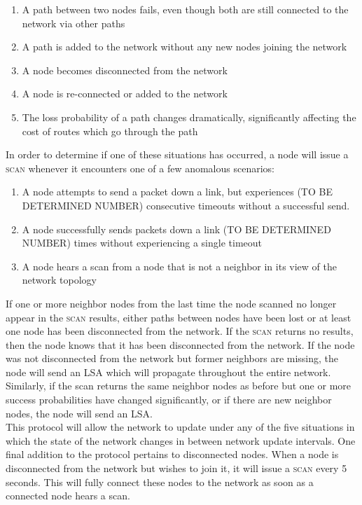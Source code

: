 \documentclass[letterpaper]{article}
\begin{document}
\begin{enumerate}
  \item A path between two nodes fails, even though both are still connected to the network via other
  paths
  \item A path is added to the network without any new nodes joining the network
  \item A node becomes disconnected from the network
  \item A node is re-connected or added to the network
  \item The loss probability of a path changes dramatically, significantly affecting the cost of
  routes which go through the path
\end{enumerate}

\noindent In order to determine if one of these situations has occurred, a node will issue a 
\textsc{scan} whenever it encounters one of a few anomalous scenarios:

\begin{enumerate}
  \item A node attempts to send a packet down a link, but experiences (TO BE DETERMINED NUMBER) 
  consecutive timeouts without a successful send.
  \item A node successfully sends packets down a link (TO BE DETERMINED NUMBER) times without
  experiencing a single timeout
  \item A node hears a scan from a node that is not a neighbor in its view of the network topology
\end{enumerate}

\noindent If one or more neighbor nodes from the last time the node scanned no longer appear in 
the \textsc{scan} results, either paths between nodes have been lost or at least one node has
been disconnected from the network. If the \textsc{scan} returns no results, then the node knows
that it has been disconnected from the network. If the node was not disconnected from the network
but former neighbors are missing, the node will send an LSA which will propagate throughout the
entire network. Similarly, if the scan returns the same neighbor nodes as before but one or more
success probabilities have changed significantly, or if there are new neighbor nodes, the node will
send an LSA.
\\

\noindent This protocol will allow the network to update under any of the five situations in which
the state of the network changes in between network update intervals. One final addition to the
protocol pertains to disconnected nodes. When a node is disconnected from the network but wishes to
join it, it will issue a \textsc{scan} every 5 seconds. This will fully connect these nodes to the
network as soon as a connected node hears a scan. 
\end{document}
